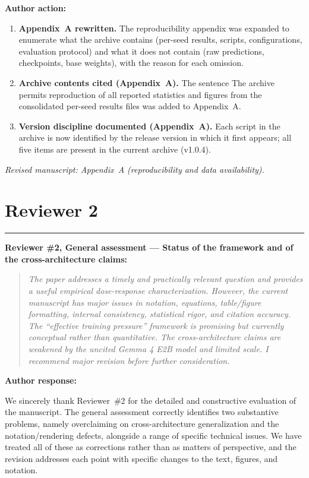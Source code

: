 \documentclass[11pt,a4paper]{article}
\newcommand{\newtext}[1]{#1}
\newcommand{\rconcern}[3]{%
  \bigskip\noindent\rule{\linewidth}{0.4pt}\par\medskip
  \noindent\textbf{\textcolor{rccolor}{#1 --- #2:}}\par
  \smallskip
  \begin{quote}\itshape\textcolor{rccolor}{#3}\end{quote}%
}
\newcommand{\arhead}[1]{\medskip\noindent\textbf{#1}\par\smallskip}
\newcommand{\newtext}[1]{\textcolor{chgcolor}{``#1''}}
\newcommand{\msloc}[1]{%
  \smallskip\noindent\textit{Revised manuscript: #1}\par%
}
\begin{document}
\arhead{Author action:}
\begin{enumerate}[leftmargin=1.4em,itemsep=0.3em]
\item \textbf{Appendix~A rewritten.}
      The reproducibility appendix was expanded to enumerate what the
      archive contains (per-seed results, scripts, configurations,
      evaluation protocol) and what it does not contain (raw predictions,
      checkpoints, base weights), with the reason for each omission.
\item \textbf{Archive contents cited (Appendix~A).}
      The sentence \newtext{The archive permits reproduction of all
      reported statistics and figures from the consolidated per-seed
      results files} was added to Appendix~A.
\item \textbf{Version discipline documented (Appendix~A).}
      Each script in the archive is now identified by the release
      version in which it first appears; all five items are present in
      the current archive (v1.0.4).
\end{enumerate}

\msloc{Appendix~A (reproducibility and data availability).}



\section*{Reviewer 2}

\rconcern{Reviewer \#2, General assessment}{Status of the framework and
of the cross-architecture claims}{%
The paper addresses a timely and practically relevant question and
provides a useful empirical dose-response characterization. However, the
current manuscript has major issues in notation, equations,
table/figure formatting, internal consistency, statistical rigor, and
citation accuracy. The ``effective training pressure'' framework is
promising but currently conceptual rather than quantitative. The
cross-architecture claims are weakened by the uncited Gemma 4 E2B model
and limited scale. I recommend major revision before further
consideration.}

\arhead{Author response:}
We sincerely thank Reviewer~\#2 for the detailed and constructive evaluation of the manuscript. The general assessment correctly identifies two substantive problems, namely overclaiming on cross-architecture generalization and the notation/rendering defects, alongside a range of specific technical issues. We have treated all of these as corrections rather than as matters of perspective, and the revision addresses each point with specific changes to the text, figures, and notation.
\end{document}
